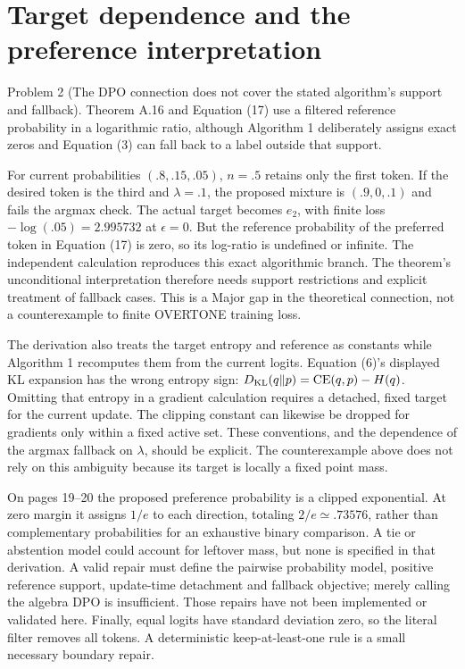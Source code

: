 \documentclass[10pt]{article}
\begin{document}
\section*{Target dependence and the preference interpretation}
Problem 2 (The DPO connection does not cover the stated algorithm’s support and fallback).  Theorem A.16 and Equation (17) use a filtered reference probability in a logarithmic ratio, although Algorithm 1 deliberately assigns exact zeros and Equation (3) can fall back to a label outside that support.\par
For current probabilities \((.8,.15,.05)\), \(n=.5\) retains only the first token. If the desired token is the third and \(\lambda=.1\), the proposed mixture is \((.9,0,.1)\) and fails the argmax check. The actual target becomes \(e_2\), with finite loss \(-\log(.05)=2.995732\) at \(\epsilon=0\). But the reference probability of the preferred token in Equation (17) is zero, so its log-ratio is undefined or infinite. The independent calculation reproduces this exact algorithmic branch. The theorem’s unconditional interpretation therefore needs support restrictions and explicit treatment of fallback cases. This is a Major gap in the theoretical connection, not a counterexample to finite OVERTONE training loss.\par
The derivation also treats the target entropy and reference as constants while Algorithm 1 recomputes them from the current logits. Equation (6)’s displayed KL expansion has the wrong entropy sign: \(D_{\rm KL}(q\|p)=\operatorname{CE}(q,p)-H(q)\). Omitting that entropy in a gradient calculation requires a detached, fixed target for the current update. The clipping constant can likewise be dropped for gradients only within a fixed active set. These conventions, and the dependence of the argmax fallback on \(\lambda\), should be explicit. The counterexample above does not rely on this ambiguity because its target is locally a fixed point mass.\par
On pages 19–20 the proposed preference probability is a clipped exponential. At zero margin it assigns \(1/e\) to each direction, totaling \(2/e\simeq.73576\), rather than complementary probabilities for an exhaustive binary comparison. A tie or abstention model could account for leftover mass, but none is specified in that derivation. A valid repair must define the pairwise probability model, positive reference support, update-time detachment and fallback objective; merely calling the algebra DPO is insufficient. Those repairs have not been implemented or validated here. Finally, equal logits have standard deviation zero, so the literal filter removes all tokens. A deterministic keep-at-least-one rule is a small necessary boundary repair.\par
\end{document}
